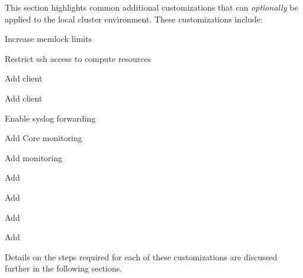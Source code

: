 This section highlights common additional customizations that can {\em
optionally} be applied to the local cluster environment. These customizations
include:

\begin{multicols}{2}
\begin{itemize*}
\item Increase memlock limits
\item Restrict ssh access to compute resources
\item Add \beegfs{} client
\item Add \Lustre{} client
\item Enable syslog forwarding
\item Add \Nagios{} Core monitoring
\item Add \Ganglia{} monitoring
\item Add \clustershell{}
\item Add \mrsh{}
\item Add \genders{}
\item Add \conman{}  
\end{itemize*}
\end{multicols}

\noindent Details on the steps required for each of these customizations are
discussed further in the following sections.
